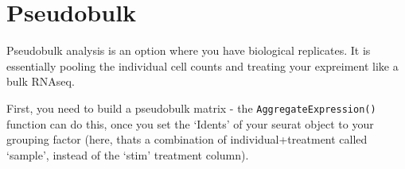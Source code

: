\documentclass[
]{book}
\newenvironment{Shaded}{\begin{snugshade}}{\end{snugshade}}
\newcommand{\AttributeTok}[1]{\textcolor[rgb]{0.13,0.29,0.53}{#1}}
\newcommand{\CommentTok}[1]{\textcolor[rgb]{0.56,0.35,0.01}{\textit{#1}}}
\newcommand{\FunctionTok}[1]{\textcolor[rgb]{0.13,0.29,0.53}{\textbf{#1}}}
\newcommand{\NormalTok}[1]{#1}
\newcommand{\OtherTok}[1]{\textcolor[rgb]{0.56,0.35,0.01}{#1}}
\newcommand{\SpecialCharTok}[1]{\textcolor[rgb]{0.81,0.36,0.00}{\textbf{#1}}}
\newcommand{\StringTok}[1]{\textcolor[rgb]{0.31,0.60,0.02}{#1}}
\begin{document}
\hypertarget{pseudobulk}{%
\section{Pseudobulk}\label{pseudobulk}}

Pseudobulk analysis is an option where you have biological replicates. It is essentially pooling the individual cell counts and treating your expreiment like a bulk RNAseq.

First, you need to build a pseudobulk matrix - the \texttt{AggregateExpression()} function can do this, once you set the `Idents' of your seurat object to your grouping factor (here, thats a combination of individual+treatment called `sample', instead of the `stim' treatment column).

\begin{Shaded}
\end{Shaded}
\end{document}
